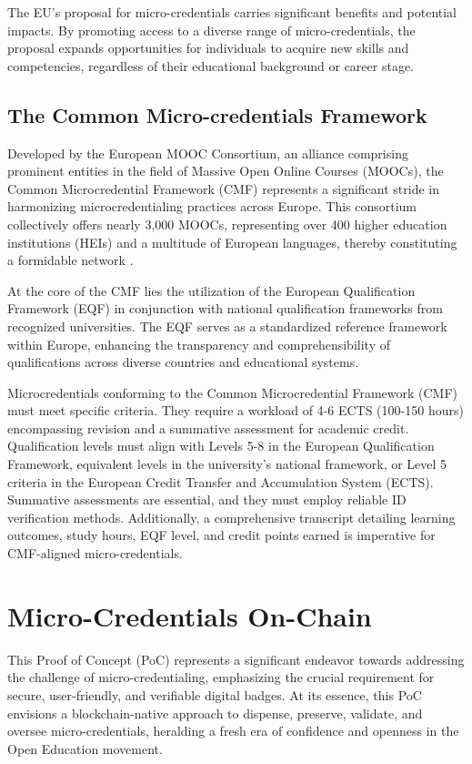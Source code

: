 \documentclass{article}
\begin{document}
\begin{multicols}{2}
    The EU's proposal for micro-credentials carries significant benefits and potential impacts. By promoting access to a diverse range of micro-credentials, the proposal expands opportunities for individuals to acquire new skills and competencies, regardless of their educational background or career stage.

    \subsection{The Common Micro-credentials Framework}
    Developed by the European MOOC Consortium, an alliance comprising prominent entities in the field of Massive Open Online Courses (MOOCs), the Common Microcredential Framework (CMF) represents a significant stride in harmonizing microcredentialing practices across Europe. This consortium collectively offers nearly 3,000 MOOCs, representing over 400 higher education institutions (HEIs) and a multitude of European languages, thereby constituting a formidable network \cite{konings_2023}.

    At the core of the CMF lies the utilization of the European Qualification Framework (EQF) in conjunction with national qualification frameworks from recognized universities. The EQF serves as a standardized reference framework within Europe, enhancing the transparency and comprehensibility of qualifications across diverse countries and educational systems.

    Microcredentials conforming to the Common Microcredential Framework (CMF) must meet specific criteria. They require a workload of 4-6 ECTS (100-150 hours) encompassing revision and a summative assessment for academic credit. Qualification levels must align with Levels 5-8 in the European Qualification Framework, equivalent levels in the university's national framework, or Level 5 criteria in the European Credit Transfer and Accumulation System (ECTS). Summative assessments are essential, and they must employ reliable ID verification methods. Additionally, a comprehensive transcript detailing learning outcomes, study hours, EQF level, and credit points earned is imperative for CMF-aligned micro-credentials.

    \section{Micro-Credentials On-Chain}

    This Proof of Concept (PoC) represents a significant endeavor towards addressing the challenge of micro-credentialing, emphasizing the crucial requirement for secure, user-friendly, and verifiable digital badges. At its essence, this PoC envisions a blockchain-native approach to dispense, preserve, validate, and oversee micro-credentials, heralding a fresh era of confidence and openness in the Open Education movement.


\end{multicols}
\end{document}
